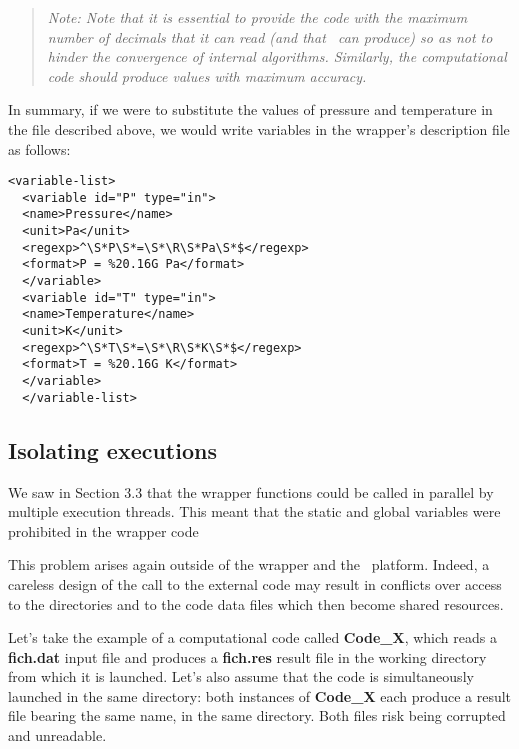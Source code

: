 \small
\begin{quote}
  \textit{Note: Note that it is essential to provide the code with the maximum number of decimals that it can read (and that \OT\ can produce) so as not to hinder the convergence of internal algorithms. Similarly, the computational code should produce values with maximum accuracy.}
\end{quote}
\normalsize

In summary, if we were to substitute the values of pressure and temperature in the file described above, we would write variables in the wrapper's description file as follows:

\lstset{language=XML, basicstyle=\normalsize}
\begin{lstlisting}[frame=TBRL]
  <variable-list>
  <variable id="P" type="in">
  <name>Pressure</name>
  <unit>Pa</unit>
  <regexp>^\S*P\S*=\S*\R\S*Pa\S*$</regexp>
  <format>P = %20.16G Pa</format>
  </variable>
  <variable id="T" type="in">
  <name>Temperature</name>
  <unit>K</unit>
  <regexp>^\S*T\S*=\S*\R\S*K\S*$</regexp>
  <format>T = %20.16G K</format>
  </variable>
  </variable-list>
\end{lstlisting}

\subsection{Isolating executions}

We saw in Section 3.3 that the wrapper functions could be called in parallel by multiple execution threads. This meant that the static and global variables were prohibited in the wrapper code%

This problem arises again outside of the wrapper and the \OT\ platform. Indeed, a careless design of the call to the external code may result in conflicts over access to the directories and to the code data files which then become shared resources.

Let's take the example of a computational code called {\bf Code\_X}, which reads a {\bf fich.dat} input file and produces a {\bf fich.res} result file in the working directory from which it is launched. Let's also assume that the code is simultaneously launched in the same directory: both instances of {\bf Code\_X} each produce a result file bearing the same name, in the same directory. Both files risk being corrupted and unreadable.

